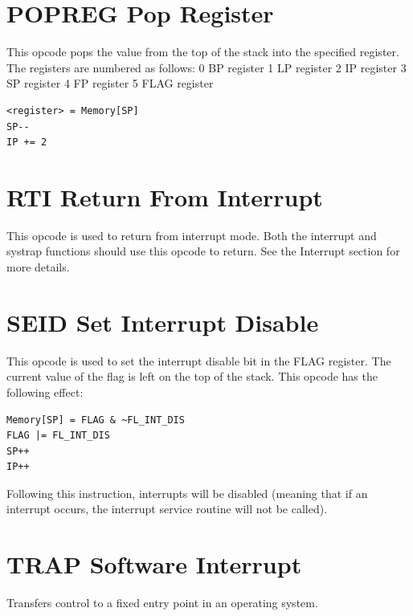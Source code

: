 \documentclass[11pt,a4paper,oneside]{book}
\begin{document}
\pagebreak
\section[POPREG]{\texorpdfstring{POPREG \hfill Pop Register}{POPREG -- Pop Register}}
This opcode pops the value from the top of the stack into the specified register. The registers are numbered as follows:
0 BP register
1 LP register
2 IP register
3 SP register
4 FP register
5 FLAG register
\begin{verbatim}
<register> = Memory[SP]
SP--
IP += 2
\end{verbatim}

\pagebreak
\section[RTI]{\texorpdfstring{RTI \hfill Return From Interrupt}{RTI -- Return From Interrupt}}
This opcode is used to return from interrupt mode. Both the interrupt and systrap functions should use this opcode to return. See the Interrupt section for more details.

\pagebreak
\section[SEID]{\texorpdfstring{SEID \hfill Set Interrupt Disable}{SEID -- Set Interrupt Disable}}
This opcode is used to set the interrupt disable bit in the FLAG register. The current value of
the flag is left on the top of the stack. This opcode has the following effect:
\begin{verbatim}
Memory[SP] = FLAG & ~FL_INT_DIS
FLAG |= FL_INT_DIS
SP++
IP++
\end{verbatim}
Following this instruction, interrupts will be disabled (meaning that if an interrupt occurs, the
interrupt service routine will not be called).

\pagebreak
\section[TRAP]{\texorpdfstring{TRAP \hfill Software Interrupt}{TRAP -- Software Interrupt}}
Transfers control to a fixed entry point in an operating system.
\end{document}
